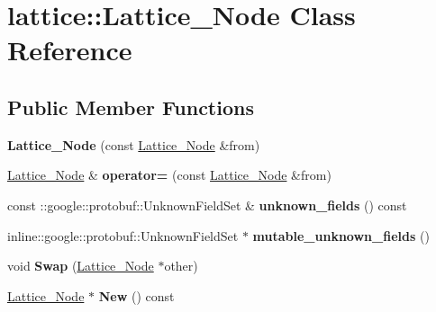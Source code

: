 \hypertarget{classlattice_1_1Lattice__Node}{
\section{lattice::Lattice\_\-Node Class Reference}
\label{classlattice_1_1Lattice__Node}
}
\subsection*{Public Member Functions}
\begin{DoxyCompactItemize}
\item 
\hypertarget{classlattice_1_1Lattice__Node_a147424c31f0775202a79ceab4fa2fe8d}{
{\bfseries Lattice\_\-Node} (const \hyperlink{classlattice_1_1Lattice__Node}{Lattice\_\-Node} \&from)}
\label{classlattice_1_1Lattice__Node_a147424c31f0775202a79ceab4fa2fe8d}

\item 
\hypertarget{classlattice_1_1Lattice__Node_a27f953898aafca2d9fbd2622c4eeabbd}{
\hyperlink{classlattice_1_1Lattice__Node}{Lattice\_\-Node} \& {\bfseries operator=} (const \hyperlink{classlattice_1_1Lattice__Node}{Lattice\_\-Node} \&from)}
\label{classlattice_1_1Lattice__Node_a27f953898aafca2d9fbd2622c4eeabbd}

\item 
\hypertarget{classlattice_1_1Lattice__Node_a2f70b3b935aef09e0aee93a1e8a15561}{
const ::google::protobuf::UnknownFieldSet \& {\bfseries unknown\_\-fields} () const }
\label{classlattice_1_1Lattice__Node_a2f70b3b935aef09e0aee93a1e8a15561}

\item 
\hypertarget{classlattice_1_1Lattice__Node_a5c846fa08d1f88c39655400947f1c3cc}{
inline::google::protobuf::UnknownFieldSet $\ast$ {\bfseries mutable\_\-unknown\_\-fields} ()}
\label{classlattice_1_1Lattice__Node_a5c846fa08d1f88c39655400947f1c3cc}

\item 
\hypertarget{classlattice_1_1Lattice__Node_ab39220e03258bb1064634db1f021b0e3}{
void {\bfseries Swap} (\hyperlink{classlattice_1_1Lattice__Node}{Lattice\_\-Node} $\ast$other)}
\label{classlattice_1_1Lattice__Node_ab39220e03258bb1064634db1f021b0e3}

\item 
\hypertarget{classlattice_1_1Lattice__Node_ae0c20f6b6b29d71d40596d133b52dcfa}{
\hyperlink{classlattice_1_1Lattice__Node}{Lattice\_\-Node} $\ast$ {\bfseries New} () const }
\label{classlattice_1_1Lattice__Node_ae0c20f6b6b29d71d40596d133b52dcfa}


\end{DoxyCompactItemize}
